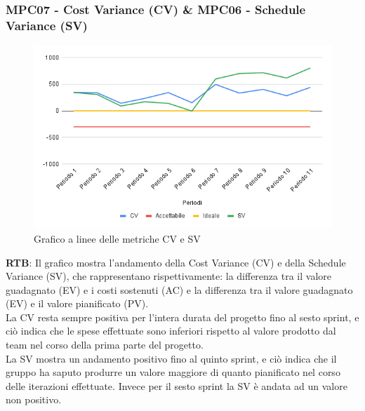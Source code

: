 \documentclass[10pt]{article}
\begin{document}
\begin{justify}
\subsubsection{MPC07 - Cost Variance (CV) \& MPC06 - Schedule Variance (SV)}

\begin{figure}[H]
  \centering
  \includegraphics[width=0.9\linewidth]{CV-SV.png}
  \caption{Grafico a linee delle metriche CV e SV}
  \label{fig:CV-SVchart}
\end{figure}

\textbf{RTB}: Il grafico mostra l'andamento  della Cost Variance (CV) e della Schedule Variance (SV), che rappresentano rispettivamente: 
la differenza tra il valore guadagnato (EV) e i costi sostenuti (AC) e la differenza tra il valore guadagnato (EV) e il valore pianificato (PV).\\
La CV resta sempre positiva per l'intera durata del progetto fino al sesto sprint, e ciò indica che le spese effettuate sono inferiori rispetto al valore prodotto
dal team nel corso della prima parte del progetto.\\
La SV mostra un andamento positivo fino al quinto sprint, e ciò indica che il gruppo ha saputo produrre un valore maggiore di quanto
pianificato nel corso delle iterazioni effettuate. Invece per il sesto sprint la SV è andata ad un valore non positivo.\\


\end{justify}
\end{document}
